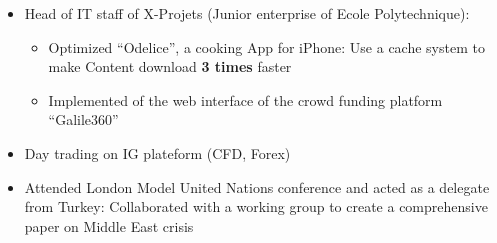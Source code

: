 \documentclass[letterpaper,11pt]{article}
\begin{document}
\begin{itemize}
\item Head of IT staff of X-Projets (Junior enterprise of Ecole Polytechnique):\vspace{-5pt}
  \begin{itemize}
  \item Optimized ``Odelice'', a cooking App for iPhone: Use a cache system to make Content download \textbf{3 times} faster
  \item Implemented of the web interface of the crowd funding platform ``Galile360''
  \end{itemize}
\item Day trading on IG plateform (CFD, Forex)
\item Attended London Model United Nations conference and acted as a delegate from Turkey: Collaborated with a working group to create a comprehensive paper on Middle East crisis
\end{itemize}
\end{document}
